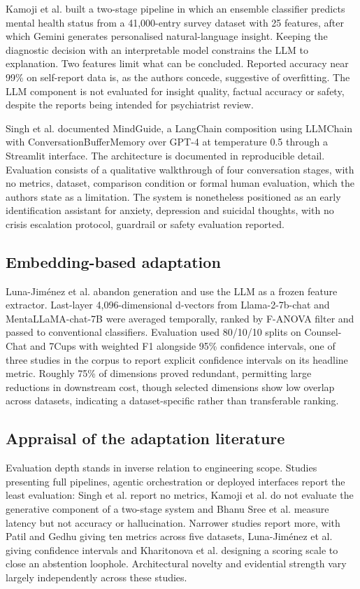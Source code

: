 \documentclass[11pt]{article}
\begin{document}
	Kamoji et al.\cite{10675718} built a two-stage pipeline in which an ensemble classifier predicts mental health status from a 41,000-entry survey dataset with 25 features, after which Gemini generates personalised natural-language insight. Keeping the diagnostic decision with an interpretable model constrains the LLM to explanation. Two features limit what can be concluded. Reported accuracy near 99\% on self-report data is, as the authors concede, suggestive of overfitting. The LLM component is not evaluated for insight quality, factual accuracy or safety, despite the reports being intended for psychiatrist review.
	
	Singh et al.\cite{10427865} documented MindGuide, a LangChain composition using LLMChain with ConversationBufferMemory over GPT-4 at temperature 0.5 through a Streamlit interface. The architecture is documented in reproducible detail. Evaluation consists of a qualitative walkthrough of four conversation stages, with no metrics, dataset, comparison condition or formal human evaluation, which the authors state as a limitation. The system is nonetheless positioned as an early identification assistant for anxiety, depression and suicidal thoughts, with no crisis escalation protocol, guardrail or safety evaluation reported.
	
	\subsection{Embedding-based adaptation}
	
	Luna-Jiménez et al.\cite{10601118} abandon generation and use the LLM as a frozen feature extractor. Last-layer 4,096-dimensional d-vectors from Llama-2-7b-chat and MentaLLaMA-chat-7B were averaged temporally, ranked by F-ANOVA filter and passed to conventional classifiers. Evaluation used 80/10/10 splits on Counsel-Chat and 7Cups with weighted F1 alongside 95\% confidence intervals, one of three studies in the corpus to report explicit confidence intervals on its headline metric. Roughly 75\% of dimensions proved redundant, permitting large reductions in downstream cost, though selected dimensions show low overlap across datasets, indicating a dataset-specific rather than transferable ranking.
	
	\subsection{Appraisal of the adaptation literature}
	
	Evaluation depth stands in inverse relation to engineering scope. Studies presenting full pipelines, agentic orchestration or deployed interfaces report the least evaluation: Singh et al. report no metrics, Kamoji et al. do not evaluate the generative component of a two-stage system and Bhanu Sree et al. measure latency but not accuracy or hallucination. Narrower studies report more, with Patil and Gedhu giving ten metrics across five datasets, Luna-Jiménez et al. giving confidence intervals and Kharitonova et al. designing a scoring scale to close an abstention loophole. Architectural novelty and evidential strength vary largely independently across these studies.
	
\end{document}

